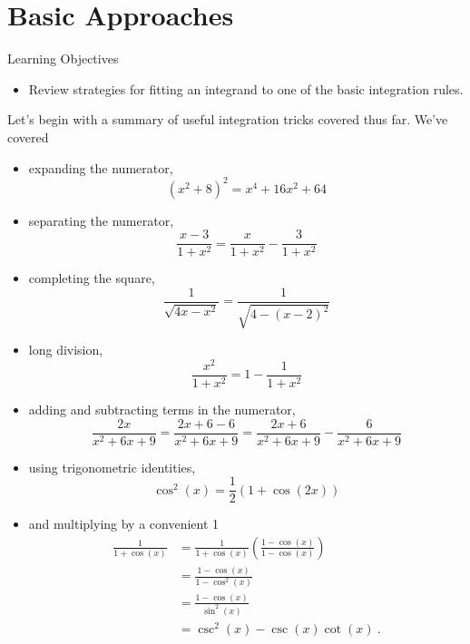 \documentclass[compacto,10pt,comentarios]{aleph-notas}
\begin{document}
\encabezado

\section*{Basic Approaches}
\begin{mdframed}
    \center Learning Objectives \\
    \begin{itemize}
        \item Review strategies for fitting an integrand to one of the basic integration rules.
    \end{itemize}
\end{mdframed}
Let's begin with a summary of useful integration tricks covered thus far. We've covered
\begin{itemize}
    \item expanding the numerator,
    $$
        (x ^ {2} + 8)^{2} = x ^ {4} + 16x ^ {2} + 64
    $$
    \item separating the numerator,
    $$
        \frac{x - 3}{1 + x ^ {2}} = \frac{x}{1 + x ^ {2}} - \frac{3}{1 + x ^ {2}}
    $$
    \item completing the square,
    $$
        \frac{1}{\sqrt{4x - x^{2}}} = \frac{1}{\sqrt{4 - (x - 2)^{2}}}
    $$
    \item long division,
    $$
        \frac{x^{2}}{1 + x^{2}} = 1 - \frac{1}{1 + x^{2}}
    $$
    \item adding and subtracting terms in the numerator,
    $$
        \frac{2x}{x^{2} + 6x + 9} = \frac{2x + 6 - 6}{x^{2} + 6x + 9} = \frac{2x + 6}{x^{2} + 6x + 9} - \frac{6}{x^{2} + 6x + 9}
    $$
    \item using trigonometric identities,
    $$
        \cos^{2}(x) = \frac{1}{2} \left( 1 + \cos(2x) \right)
    $$
    \item and multiplying by a convenient 1
    \begin{align*}
        \frac{1}{1 + \cos(x)} 
        & = \frac{1}{1 + \cos(x)} \left( \frac{1-\cos(x)}{1 - \cos(x)} \right) \\
        & = \frac{1 - \cos(x)}{1 - \cos^{2}(x)} \\
        & = \frac{1-\cos(x)}{\sin^{2}(x)} \\
        & = \csc^{2}(x) - \csc(x) \cot(x) ~ .
    \end{align*}


\end{itemize}
\end{document}
